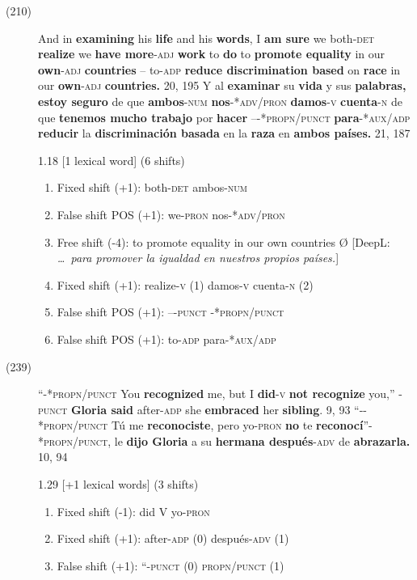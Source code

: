 \documentclass[output=paper]{langsci/langscibook}
\begin{document}
\begin{description}
  \item[(210)] And in \textbf{examining} his \textbf{life} and his \textbf{words}, I \textbf{am sure} we both\textsc{-det} \textbf{realize} we \textbf{have more}\textsc{-adj} \textbf{work} to \textbf{do} to \textbf{promote equality} in our \textbf{own}\textsc{-adj}\textbf{ countries} -- to-\textsc{adp} \textbf{reduce discrimination based} on \textbf{race} in our \textbf{own}\textsc{-adj} \textbf{countries.} 20, 195 \rightarrow Y al \textbf{examinar} su \textbf{vida} y sus \textbf{palabras, estoy seguro} de que \textbf{ambos}\textsc{-num} \textbf{nos}\textsc{-*adv/pron} \textbf{damos}-\textsc{v}\textbf{ cuenta}-\textsc{n} de que \textbf{tenemos mucho trabajo} por\textbf{ hacer} {--}-*\textsc{propn/punct} \textbf{para}-*\textsc{aux/adp} \textbf{reducir} la \textbf{discriminación basada} en la \textbf{raza} en \textbf{ambos países.} 21, 187

    1.18 [1 lexical word] (6 shifts)

    \begin{enumerate}
      \item Fixed shift (+1): both\textsc{-det} \rightarrow ambos\textsc{-num}
      \item False shift POS (+1): we\textsc{-pron} \rightarrow nos\textsc{-*adv/pron}
      \item Free shift (-4): to promote equality in our own countries \rightarrow Ø [DeepL: \textit{\dots\ para promover la igualdad en nuestros propios países.}] 
      \item Fixed shift (+1): realize-\textsc{v} (1) \rightarrow damos-\textsc{v} cuenta-\textsc{n} (2)
      \item False shift POS (+1): --\textsc{-punct} \rightarrow {--}-*\textsc{propn/punct}
      \item False shift POS (+1): to-\textsc{adp} \rightarrow para-*\textsc{aux/adp}
    \end{enumerate}

  \item[(239)] ``-\textsc{*propn/punct} You \textbf{recognized} me, but I \textbf{did}\textsc{-v} \textbf{not recognize} you,'' -\textsc{punct} \textbf{Gloria said} after-\textsc{adp} she \textbf{embraced} her \textbf{sibling}. 9, 93 \rightarrow ``-\textsc{-*propn/punct} Tú me \textbf{reconociste}, pero yo-\textsc{pron} \textbf{no} te \textbf{reconocí}''-\textsc{*propn/punct}, le \textbf{dijo Gloria} a su \textbf{hermana después}\textsc{-adv} de \textbf{abrazarla.} 10, 94

    1.29 [+1 lexical words] (3 shifts)
\largerpage
    \begin{enumerate}
      \item Fixed shift (-1): did V \rightarrow yo-\textsc{pron}
      \item Fixed shift (+1): after-\textsc{adp} (0) \rightarrow después-\textsc{adv (1)}
      \item False shift (+1): ``-\textsc{punct (0) \rightarrow *propn/punct (1)}
    \end{enumerate}
\end{description}
\end{document}
